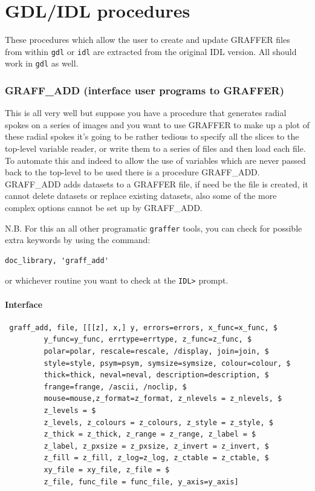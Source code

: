 \documentclass[11pt,twoside,english]{article}
\begin{document}
\part{GDL/IDL procedures}
\label{part:gdl}

These procedures which allow the user to create and update GRAFFER
files from within \texttt{gdl} or \texttt{idl} are extracted from the
original IDL version. All should work in \texttt{gdl} as well.

\section{GRAFF\_ADD (interface user programs to GRAFFER)}
\label{sec:graff_add}

This is all very well but suppose you have a procedure that generates
radial spokes on a series of images and you want to use GRAFFER to make
up a plot of these radial spokes it's going to be rather tedious to
specify all the slices to the top-level variable reader, or write them
to a series of files and then load each file. To automate this and
indeed to allow the use of variables which are never passed back to the
top-level to be used there is a procedure GRAFF\_ADD. GRAFF\_ADD adds
datasets to a GRAFFER file, if need be the file is created, it cannot
delete datasets or replace existing datasets, also some of the more
complex options cannot be set up by GRAFF\_ADD.

N.B. For this an all other programatic \texttt{graffer} tools, you can
check for possible extra keywords by using the command:
\begin{verbatim}
doc_library, 'graff_add'
\end{verbatim}
or whichever routine you want to check at the \texttt{IDL>} prompt.

\subsection{Interface}

\begin{verbatim}
 graff_add, file, [[[z], x,] y, errors=errors, x_func=x_func, $
         y_func=y_func, errtype=errtype, z_func=z_func, $
         polar=polar, rescale=rescale, /display, join=join, $
         style=style, psym=psym, symsize=symsize, colour=colour, $
         thick=thick, neval=neval, description=description, $
         frange=frange, /ascii, /noclip, $
         mouse=mouse,z_format=z_format, z_nlevels = z_nlevels, $
         z_levels = $ 
         z_levels, z_colours = z_colours, z_style = z_style, $
         z_thick = z_thick, z_range = z_range, z_label = $
         z_label, z_pxsize = z_pxsize, z_invert = z_invert, $
         z_fill = z_fill, z_log=z_log, z_ctable = z_ctable, $
         xy_file = xy_file, z_file = $
         z_file, func_file = func_file, y_axis=y_axis]
\end{verbatim}
\end{document}
